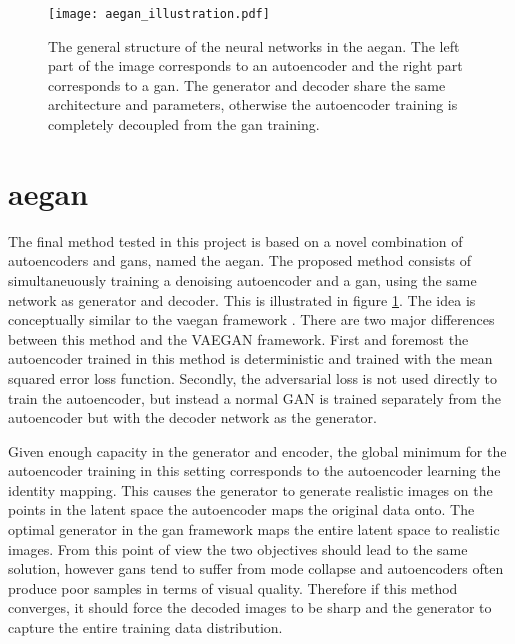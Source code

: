 \begin{figure}[t]
    \centering
    \texttt{[image: aegan\_illustration.pdf]}
    \caption{The general structure of the neural networks in the \acrlong{aegan}. The left part of the image corresponds to an autoencoder and the right part corresponds to a \acrshort{gan}. The generator and decoder share the same architecture and parameters, otherwise the autoencoder training is completely decoupled from the \acrshort{gan} training.}
    \label{fig:aegan}
\end{figure}

\section{\acrlong{aegan}}
The final method tested in this project is based on a novel combination of autoencoders and \acrshort{gans}, named the \acrfull{aegan}. The proposed method consists of simultaneuously training a denoising autoencoder and a \acrshort{gan}, using the same network as generator and decoder. This is illustrated in figure \ref{fig:aegan}. The idea is conceptually similar to the \acrshort{vaegan} framework \parencite{LarsenSW15autoencodingbeyond}. There are two major differences between this method and the VAEGAN framework. First and foremost the autoencoder trained in this method is deterministic and trained with the mean squared error loss function. Secondly, the adversarial loss is not used directly to train the autoencoder, but instead a normal GAN is trained separately from the autoencoder but with the decoder network as the generator. 

Given enough capacity in the generator and encoder, the global minimum for the autoencoder training in this setting corresponds to the autoencoder learning the identity mapping. This causes the generator to generate realistic images on the points in the latent space the autoencoder maps the original data onto. The optimal generator in the \acrshort{gan} framework maps the entire latent space to realistic images. From this point of view the two objectives should lead to the same solution, however \acrshort{gans} tend to suffer from mode collapse and autoencoders often produce poor samples in terms of visual quality. Therefore if this method converges, it should force the decoded images to be sharp and the generator to capture the entire training data distribution. 


